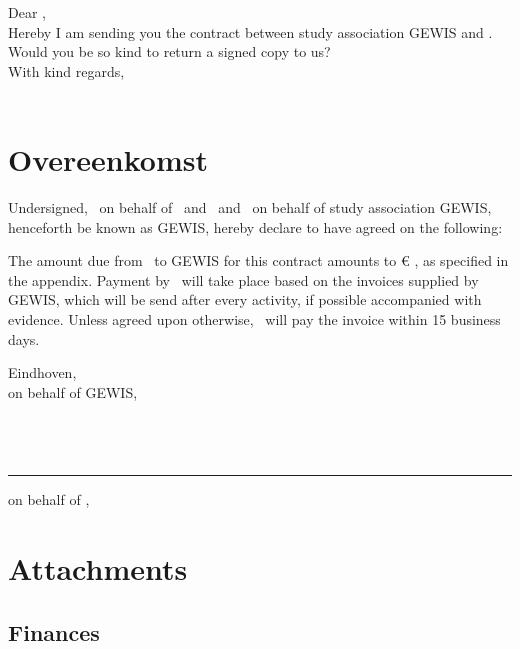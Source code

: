 \documentclass[
 digital,         %
 english         %
]{GEWISLetter}
\newcommand{\GEWIScontact}{%
\\%
}
\newcommand{\contractantOne}{%
}
\newcommand{\contractantTwo}{%
}
\newcommand{\COMPANYcontact}{%
}
\begin{document}
\GEWISfirstpage                 %
\printadresenkenmerk            %

Dear %
,\\[2\baselineskip]
Hereby I am sending you the contract between study association GEWIS and \GEWISRecipient . Would you be so kind to return a signed copy to us?
\\[2\baselineskip]

With kind regards,\\[2\baselineskip]
\GEWIScontact

\section{Overeenkomst}
Undersigned, \COMPANYcontact\ on behalf of \GEWISRecipient\, and \contractantOne\ and \contractantTwo\ on behalf of study association GEWIS, henceforth be known as GEWIS, hereby declare to have agreed on the following:

The amount due from \GEWISRecipient\ to GEWIS for this contract amounts to \euro{}%
, as specified in the appendix. Payment by \GEWISRecipient\ will take place based on the invoices supplied by GEWIS, which will be send after every activity, if possible accompanied with evidence. Unless agreed upon otherwise, \GEWISRecipient\ will pay the invoice within 15 business days.
\\[2\baselineskip]

\begin{minipage}[t]{0.4\textwidth}
Eindhoven, \GEWISdate\,\\
on behalf of GEWIS,
\\[3\baselineskip]
\\
\\[3\baselineskip]
\\
\end{minipage}
\hfill
\begin{minipage}[t]{0.4\textwidth}
\rule{\textwidth}{0.4pt}
on behalf of \GEWISRecipient,\\[3\baselineskip]
\COMPANYcontact
\end{minipage}


\section{Attachments}

\subsection{Finances}
\end{document}
